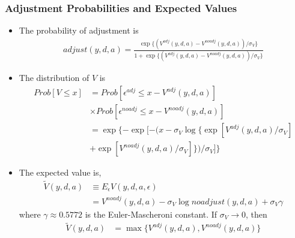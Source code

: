 \documentclass[english,xcolor=svgnames]{beamer}
\begin{document}
\begin{frame}
    \frametitle{Adjustment Probabilities and Expected Values}
    \begin{itemize}
        \item The probability of adjustment is
        \begin{align*}
            adjust(y,d,a) = \frac{\exp\{(V^{adj}(y,d,a)-V^{noadj}(y,d,a))/\sigma_V\}}{1+\exp\{(V^{adj}(y,d,a)-V^{noadj}(y,d,a))/\sigma_V\}}
        \end{align*}
        \item The distribution of $V$ is
        \begin{align*}
            Prob[V\le x] &= Prob[\epsilon^{adj}\le x - V^{adj}(y,d,a)] \\
            &\times Prob[\epsilon^{noadj}\le x - V^{noadj}(y,d,a)]\\
            &= \exp\{-\exp[ -(x - \sigma_V\log\{\exp[ V^{adj}(y,d,a)/\sigma_V]\\
            &+\exp[V^{noadj}(y,d,a)/\sigma_V]\})/\sigma_V]\} 
        \end{align*}
        \item The expected value is,
        \begin{align*}
            \tilde{V}(y,d,a) &\equiv E_{\epsilon} V(y,d,a,\epsilon) \\
            &=V^{noadj}(y,d,a) - \sigma_V  \log noadjust(y,d,a) + \sigma_V\gamma 
        \end{align*}
        where $\gamma\approx 0.5772$ is the Euler-Mascheroni constant. If $\sigma_V\rightarrow0$, then
        \begin{align*}
            \tilde{V}(y,d,a) &= \max\{V^{adj}(y,d,a), V^{noadj}(y,d,a) \} 
        \end{align*}
    \end{itemize}
\end{frame}
\end{document}
